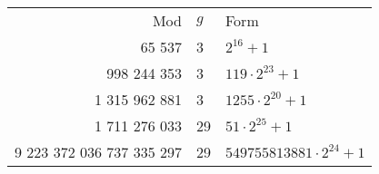 \begin{tabular}{rll}
    Mod & $g$ & Form \\
    65 537 & 3 & $2^{16}+1$ \\
    998 244 353 & 3 & $119\cdot 2^{23} + 1$ \\
    1 315 962 881 & 3 & $1255\cdot 2^{20} + 1$ \\
    1 711 276 033 & 29 & $51\cdot 2^{25} + 1$ \\
    9 223 372 036 737 335 297 & 29 & $549755813881\cdot 2^{24} + 1$ \\
\end{tabular}